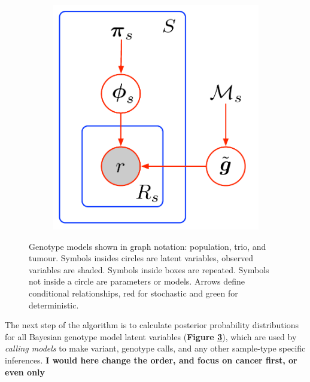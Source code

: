 \documentclass[notitlepage, twocolumn]{article}
\begin{document}
\begin{figure}[h]
\begin{subfigure}[b]{0.3\textwidth}
        \caption{}
        \label{fig:trio}
    \end{subfigure}
    \hfill
    \begin{subfigure}[b]{0.3\textwidth}
        \includegraphics[width=\textwidth]{figures/cancer_model}
        \caption{}
        \label{fig:cancer}
    \end{subfigure}
    \caption{Genotype models shown in graph notation: \protect{} population, \protect{} trio, and \protect{} tumour. Symbols insides circles are latent variables, observed variables are shaded. Symbols inside boxes are repeated. Symbols not inside a circle are parameters or models. Arrows define conditional relationships, red for stochastic and green for deterministic.}
    \label{fig:models}
\end{figure}

The next step of the algorithm is to calculate posterior probability distributions for all  Bayesian genotype model latent variables (\textbf{Figure \ref{fig:models}}), which are used by \emph{calling models} to make variant, genotype calls, and any other sample-type specific inferences. {\bf I would here change the order, and focus on cancer first, or even only}
\end{document}
